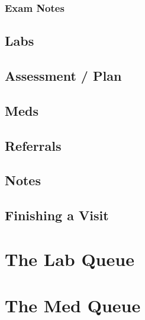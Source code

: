 \subsubsection{Exam Notes}
\subsection{Labs}
\subsection{Assessment / Plan}
\subsection{Meds}
\subsection{Referrals}
\subsection{Notes}
\subsection{Finishing a Visit}

\section{The Lab Queue}

\section{The Med Queue}

